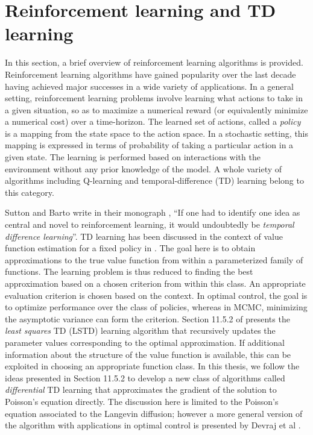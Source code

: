 

\section{Reinforcement learning and TD learning}
\label{rl_td}
In this section, a brief overview of reinforcement learning algorithms is provided. Reinforcement learning algorithms have gained popularity over the last decade having achieved major successes in a wide variety of applications. In a general setting, reinforcement learning problems involve learning what actions to take in a given situation, so as to maximize a numerical reward (or equivalently minimize a numerical cost) over a time-horizon. The learned set of actions, called a \textit{policy} is a mapping from the state space to the action space. In a stochastic setting, this mapping is expressed in terms of probability of taking a particular action in a given state. The learning is performed based on interactions with the environment without any prior knowledge of the model. A whole variety of algorithms including Q-learning and temporal-difference (TD) learning belong to this category. 

Sutton and Barto write in their monograph \cite{sutbar98}, ``If one had to identify one idea as central and novel to reinforcement learning, it would undoubtedly be \textit{temporal difference learning}''. TD learning has been discussed in the context of value function estimation for a fixed policy in \cite{ctcn}. The goal here is to obtain approximations to the true value function from within a parameterized family of functions. The learning problem is thus reduced to finding the best approximation based on a chosen criterion from within this class. An appropriate evaluation criterion is chosen based on the context. In optimal control, the goal is to optimize performance over the class of policies, whereas in MCMC, minimizing the asymptotic variance can form the criterion. Section 11.5.2 of \cite{ctcn} presents the \textit{least squares} TD (LSTD) learning algorithm that recursively updates the parameter values corresponding to the optimal approximation. If additional information about the structure of the value function is available, this can be exploited in choosing an appropriate function class. In this thesis, we follow the ideas presented in Section 11.5.2 to develop a new class of algorithms called \textit{differential} TD learning that approximates the gradient of the solution to Poisson's equation directly. The discussion here is limited to the Poisson's equation associated to the Langevin diffusion; however a more general version of the algorithm with applications in optimal control is presented by Devraj et al \cite{devmey16arXiv}.

